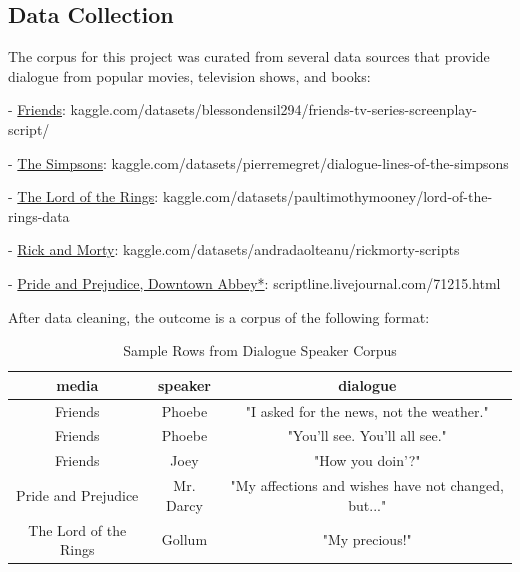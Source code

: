 \documentclass{article}
\begin{document}
\begin{titlepage}

\section{Data Collection}

The corpus for this project was curated from several data sources that provide dialogue from popular movies, television shows, and books:

- \href{https://www.kaggle.com/datasets/blessondensil294/friends-tv-series-screenplay-script/data?select=S01E01+Monica+Gets+A+Roommate.txt}{Friends}: kaggle.com/datasets/blessondensil294/friends-tv-series-screenplay-script/
 
- \href{https://www.kaggle.com/datasets/pierremegret/dialogue-lines-of-the-simpsons}{The Simpsons}: kaggle.com/datasets/pierremegret/dialogue-lines-of-the-simpsons

- \href{https://www.kaggle.com/datasets/paultimothymooney/lord-of-the-rings-data?select=lotr_scripts.csv}{The Lord of the Rings}: kaggle.com/datasets/paultimothymooney/lord-of-the-rings-data

- \href{https://www.kaggle.com/datasets/andradaolteanu/rickmorty-scripts}{Rick and Morty}: kaggle.com/datasets/andradaolteanu/rickmorty-scripts

- \href{https://scriptline.livejournal.com/71215.html#cutid6}{Pride and Prejudice, Downtown Abbey*}: scriptline.livejournal.com/71215.html

After data cleaning, the outcome is a corpus of the following format:

\begin{table}[H]
    \centering
    \begin{tabular}{|c|c|c|}
        \hline
        \textbf{} \textbf{media} & \textbf{speaker} & \textbf{dialogue} \\
        \hline
        Friends & Phoebe &  "I asked for the news, not the weather." \\
        Friends & Phoebe &  "You'll see. You'll all see." \\
        Friends & Joey &  "How you doin'?" \\
        Pride and Prejudice & Mr. Darcy &  "My affections and wishes have not changed, but..."  \\
        The Lord of the Rings & Gollum &  "My precious!" \\
        \hline
    \end{tabular}
    \caption{Sample Rows from Dialogue Speaker Corpus}
    \label{tab:images}
\end{table}


\end{titlepage}
\end{document}

